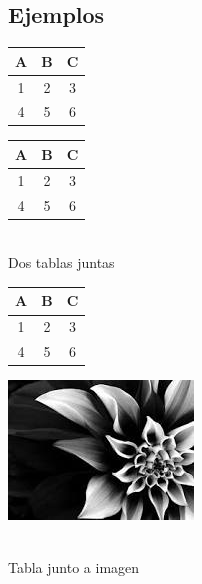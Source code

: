 \documentclass[10pt,journal,compsoc]{IEEEtran}
\begin{document}
\subsection{Ejemplos}
\begin{minipage}{0.2\textwidth}
	\begin{tabular}{|c|c|c|}
		\hline
		A & B & C \\
		\hline
		1 & 2 & 3  \\
		\hline 
		4 & 5 & 6 \\
		\hline
	\end{tabular}
\end{minipage}
\begin{minipage}{0.2\textwidth}
	\begin{tabular}{c|c|c}
		A & B & C \\
		\hline
		1 & 2 & 3  \\
		\hline 
		4 & 5 & 6 \\
	\end{tabular}
\end{minipage}\\
\newline
Dos tablas juntas\\
\begin{minipage}{0.2\textwidth}
	\begin{tabular}{c|c|c}
		A & B & C \\
		\hline
		1 & 2 & 3  \\
		\hline 
		4 & 5 & 6 \\
	\end{tabular}
\end{minipage}
\begin{minipage}{0.2\textwidth}
	\includegraphics[width=\textwidth]{pic1.jpg}
\end{minipage}\\
\newline
Tabla junto a imagen\\
\end{document}
